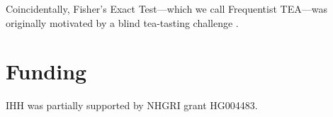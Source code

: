 Coincidentally, Fisher's Exact Test---which we call Frequentist TEA---was originally motivated by a blind tea-tasting challenge \citep{Fisher1935}.

\section*{Funding}

IHH was partially supported by NHGRI grant HG004483.


%
%
%
%
%
%
%
%



